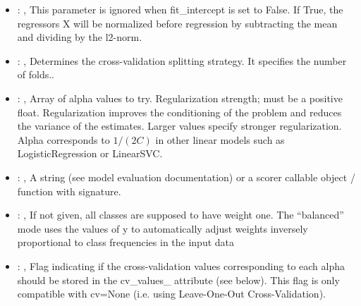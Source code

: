 \begin{itemize}
    \item {}: , 
      This parameter is ignored when fit\_intercept is set to False. If True, the
      regressors X will be normalized before regression by subtracting the mean and dividing
      by the l2-norm.

    \item {}: , 
      Determines the cross-validation splitting strategy.
      It specifies the number of folds..

    \item {}: , 
      Array of alpha values to try. Regularization strength; must be a positive float.
      Regularization                                                  improves the conditioning of
      the problem and reduces the variance of the estimates.
      Larger values specify stronger regularization. Alpha corresponds to $1 / (2C)$ in other
      linear models such as LogisticRegression or LinearSVC.

    \item {}: , 
      A string (see model evaluation documentation) or a scorer
      callable object / function with signature.

    \item {}: \xmlDesc{[balanced]}, 
      If not given, all classes are supposed to have weight one.
      The “balanced” mode uses the values of y to automatically adjust weights
      inversely proportional to class frequencies in the input data

    \item {}: , 
      Flag indicating if the cross-validation values corresponding
      to each alpha should be stored in the cv\_values\_ attribute (see below).
      This flag is only compatible with cv=None (i.e. using Leave-One-Out
      Cross-Validation).
  \end{itemize}


